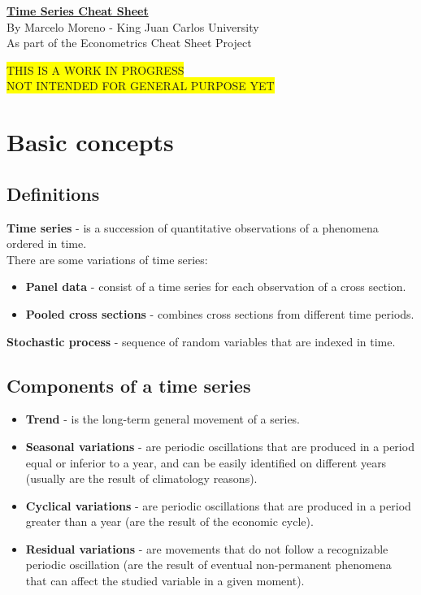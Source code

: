 \documentclass[10pt, a4paper, landscape]{extarticle}
\begin{document}
\setlength{\footskip}{12pt}

\begin{multicols}{3} %

\begin{center}
	\textbf{\LARGE \href{https://github.com/marcelomijas/econometrics-cheatsheet}{Time Series Cheat Sheet}}
	\\ {\footnotesize By Marcelo Moreno - King Juan Carlos University} 
	\\ {\footnotesize As part of the Econometrics Cheat Sheet Project}
\end{center}

\colorbox{yellow}{THIS IS A WORK IN PROGRESS}
\\ \colorbox{yellow}{NOT INTENDED FOR GENERAL PURPOSE YET}

\section*{Basic concepts}
	\subsection*{Definitions}
		\textbf{Time series} - is a succession of quantitative observations of a phenomena ordered in time.
		\\ There are some variations of time series:
		\begin{itemize}[leftmargin=*]
			\item \textbf{Panel data} - consist of a time series for each observation of a cross section.
			\item \textbf{Pooled cross sections} - combines cross sections from different time periods.
		\end{itemize}
		\textbf{Stochastic process} - sequence of random variables that are indexed in time.
	\subsection*{Components of a time series}
		\begin{itemize}[leftmargin=*]
			\item \textbf{Trend} - is the long-term general movement of a series.
			\item \textbf{Seasonal variations} - are periodic oscillations that are produced in a period equal or inferior to a year, and can be easily identified on different years (usually are the result of climatology reasons).
			\item \textbf{Cyclical variations} - are periodic oscillations that are produced in a period greater than a year (are the result of the economic cycle).
			\item \textbf{Residual variations} - are movements that do not follow a recognizable periodic oscillation (are the result of eventual non-permanent phenomena that can affect the studied variable in a given moment).
		\end{itemize}


\end{multicols}
\end{document}
